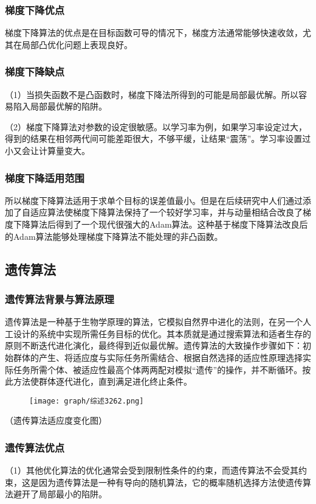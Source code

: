 \documentclass{cjc}
\begin{document}
\subsubsection{梯度下降优点}
梯度下降算法的优点是在目标函数可导的情况下，梯度方法通常能够快速收敛，尤其在局部凸优化问题上表现良好。

\subsubsection{梯度下降缺点}
（1）当损失函数不是凸函数时，梯度下降法所得到的可能是局部最优解。所以容易陷入局部最优解的陷阱。

（2）梯度下降算法对参数的设定很敏感。以学习率为例，如果学习率设定过大，得到的结果在相邻两代间可能差距很大，不够平缓，让结果“震荡”。学习率设置过小又会让计算量变大。

\subsubsection{梯度下降适用范围}
所以梯度下降算法适用于求单个目标的误差值最小。但是在后续研究中人们通过添加了自适应算法使梯度下降算法保持了一个较好学习率，并与动量相结合改良了梯度下降算法后得到了一个现代很强大的Adam算法。这种基于梯度下降算法改良后的Adam算法能够处理梯度下降算法不能处理的非凸函数。

\subsection{遗传算法}
\subsubsection{遗传算法背景与算法原理}
遗传算法是一种基于生物学原理的算法，它模拟自然界中进化的法则，在另一个人工设计的系统中实现所需任务目标的优化。其本质就是通过搜索算法和适者生存的原则不断迭代进化演化，最终得到近似最优解。遗传算法的大致操作步骤如下：初始群体的产生、将适应度与实际任务所需结合、根据自然选择的适应性原理选择实际任务所需个体、被适应性最高个体两两配对模拟“遗传”的操作，并不断循环。按此方法使群体逐代进化，直到满足进化终止条件。
\begin{figure}
  \centering
  \texttt{[image: graph/综述3262.png]}
\end{figure}（遗传算法适应度变化图）

\subsubsection{遗传算法优点}
（1）其他优化算法的优化通常会受到限制性条件的约束，而遗传算法不会受其约束，这是因为遗传算法是一种有导向的随机算法，它的概率随机选择方法使遗传算法避开了局部最小的陷阱。
\end{document}
